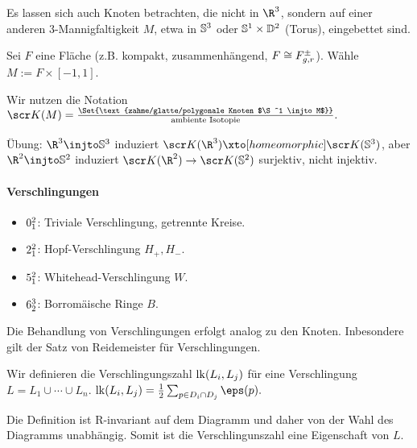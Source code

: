 Es lassen sich auch Knoten betrachten, die nicht in $\R^3$, sondern auf einer anderen $3$-Mannigfaltigkeit $M$, etwa in $\S^3$ oder $\S^1 \times \D^2$ (Torus), eingebettet sind.

\begin{ex}
    Sei $F$ eine Fläche (z.B. kompakt, zusammenhängend, $F \homeomorphic F_{g,r}^\pm$).
    Wähle $M := F \times [-1,1]$.
\end{ex}

\begin{df}
    Wir nutzen die Notation
    \begin{math}
        \scr K(M) = \frac{\Set{\text{zahme/glatte/polygonale Knoten $\S^1 \injto M$}}}{\text{ambiente Isotopie}}.
    \end{math}
\end{df}

Übung: $\R^3 \injto \S^3$ induziert $\scr K(\R^3) \homto \scr K(\S^3)$, aber $\R^2 \injto \S^2$ induziert $\scr K(\R^2) \to \scr K(\S^2)$ surjektiv, nicht injektiv.

\paragraph{Verschlingungen}

\begin{ex}
    \begin{itemize}
        \item
            $\Link{0_1^2}$: Triviale Verschlingung, getrennte Kreise.
        \item
            $\Link{2_1^2}$: Hopf-Verschlingung $H_+, H_-$.
        \item
            $\Link{5_1^2}$: Whitehead-Verschlingung $W$.
        \item
            $\Link{6_2^3}$: Borromäische Ringe $B$.
    \end{itemize}
\end{ex}

Die Behandlung von Verschlingungen erfolgt analog zu den Knoten.
Inbesondere gilt der Satz von Reidemeister für Verschlingungen.


\begin{df}
    Wir definieren die Verschlingungszahl $\lk(L_i, L_j)$ für eine Verschlingung $L = L_1 \cup \dotsb \cup L_n$.
    \begin{math}
        \lk(L_i,L_j) = \frac{1}{2} \sum_{p\in D_i \cap D_j} \eps(p).
    \end{math}
    \begin{note}
        Die Definition ist R-invariant auf dem Diagramm und daher von der Wahl des Diagramms unabhängig.
        Somit ist die Verschlingunszahl eine Eigenschaft von $L$.
    \end{note}
\end{df}


